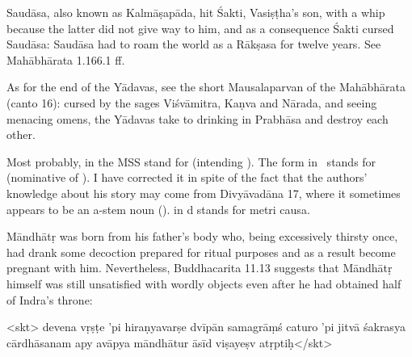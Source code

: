 { Saudāsa, also known as Kalmāṣapāda, hit Śakti, Vasiṣṭha's son, with a whip because                 the latter did not give way to him, and as a consequence Śakti cursed Saudāsa:                 Saudāsa had to roam the world as a Rākṣasa for twelve years.                  See Mahābhārata 1.166.1 ff.                 

                 As for the end of the Yādavas, see the short Mausalaparvan of the Mahābhārata (canto 16):                 cursed by the sages Viśvāmitra, Kaṇva and Nārada, and seeing menacing omens,                 the Yādavas take to drinking in Prabhāsa and destroy each other.           

Most probably,  in the MSS stand for  (intending ).                 The form  in \msCb\ stands for  (nominative of ).                 I have corrected it in spite of the fact that the authors' knowledge about his story may                 come from Divyāvadāna 17, where it sometimes appears to be an a-stem noun ().                  in  d stands for  metri causa.                 

                 Māndhātṛ was born from his father's body who, being excessively thirsty once,                 had drank some decoction prepared for ritual purposes and as a result become pregnant with him.                 Nevertheless, Buddhacarita 11.13 suggests that Māndhātṛ himself was still unsatisfied                 with wordly objects even after he had obtained half of Indra's throne:                 

                 <skt>                devena vṛṣṭe 'pi hiraṇyavarṣe  
                                         dvīpān samagrāṃś caturo 'pi jitvā\danda  
                                      śakrasya cārdhāsanam apy avāpya   
                                         māndhātur āsīd viṣayeṣv atṛptiḥ\twodanda</skt> 

}
